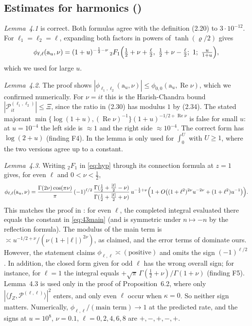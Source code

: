 \documentclass[11pt]{amsart}
\theoremstyle{remark}
\theoremstyle{definition}
\numberwithin{equation}{section}
\newcommand{\br}[1]{\langle #1\rangle}
\newcommand{\Pc}{\mathcal{P}}
\newcommand{\ra}{\mathrm{a}}
\begin{document}
\subsection{Estimates for harmonics (\texorpdfstring{\cite[\S4]{GM1}}{[GM1, §4]})}\label{sec:harmonics}
\emph{Lemma~4.1} is correct. Both formulas agree with the definition (2.20) to $3\cdot10^{-12}$. For $\ell_1=\ell_2=\ell$, expanding both factors in powers of $\tanh(\varrho/2)$ gives
\begin{equation}\label{eq:hyp}
\phi_{\ell,\ell}(\ra_u,\nu)=(1+u)^{-\frac12-\nu}\,{}_2F_1\Bigl(\tfrac12+\nu+\tfrac\ell2,\ \tfrac12+\nu-\tfrac\ell2;\ 1;\ \tfrac u{1+u}\Bigr),
\end{equation}
which we used for large $u$.

\emph{Lemma~4.2.} The proof shows $|\phi_{\ell_1,\ell_2}(\ra_u,\nu)|\le\phi_{0,0}(\ra_u,\operatorname{Re}\nu)$, which we confirmed numerically. For $\nu=it$ this is the Harish-Chandra bound $|\Pc^{(\ell_1,\ell_2)}_{it}|\le\Xi$, since the ratio in (2.30) has modulus $1$ by (2.34). The stated majorant $\min\{\log(1+u),(\operatorname{Re}\nu)^{-1}\}(1+u)^{-1/2+\operatorname{Re}\nu}$ is false for small $u$: at $u=10^{-4}$ the left side is $\approx1$ and the right side $\approx10^{-4}$. The correct form has $\log(2+u)$ (finding F4). In \cite{GM1} the lemma is only used for $\int_0^U$ with $U\ge1$, where the two versions agree up to a constant.

\emph{Lemma~4.3.} Writing ${}_2F_1$ in \eqref{eq:hyp} through its connection formula at $z=1$ gives, for even $\ell$ and $0<\nu<\frac12$,
\begin{equation}\label{eq:43main}
\phi_{\ell,\ell}(\ra_u,\nu)=\frac{\Gamma(2\nu)\cos(\pi\nu)}{\pi}\,(-1)^{\ell/2}\,\frac{\Gamma(\frac12+\frac{|\ell|}2-\nu)}{\Gamma(\frac12+\frac{|\ell|}2+\nu)}\,u^{-\frac12+\nu}\Bigl(1+O\bigl((1+\ell^2)^{2\nu}u^{-2\nu}+(1+\ell^2)u^{-1}\bigr)\Bigr).
\end{equation}
This matches the proof in \cite{GM1}: for even $\ell$, the completed integral evaluated there equals the constant in \eqref{eq:43main} (and is symmetric under $n\mapsto-n$ by the reflection formula). The modulus of the main term is $\asymp u^{-1/2+\nu}/(\nu(1+|\ell|)^{2\nu})$, as claimed, and the error terms of \cite{GM1} dominate ours. However, the statement claims $\phi_{\ell,\ell}\asymp(\text{positive})$ and omits the sign $(-1)^{\ell/2}$. In addition, the closed form given for odd $\ell$ has the wrong overall sign; for instance, for $\ell=1$ the integral equals $+\sqrt\pi\,\Gamma(\frac12+\nu)/\Gamma(1+\nu)$ (finding F5). Lemma~4.3 is used only in the proof of Proposition~6.2, where only $|\br{f_Z,\Pc^{(\ell,\ell)}}|^2$ enters, and only even $\ell$ occur when $\kappa=0$. So neither sign matters. Numerically, $\phi_{\ell,\ell}/(\text{main term})\to1$ at the predicted rate, and the signs at $u=10^8$, $\nu=0.1$, $\ell=0,2,4,6,8$ are $+,-,+,-,+$.
\end{document}
